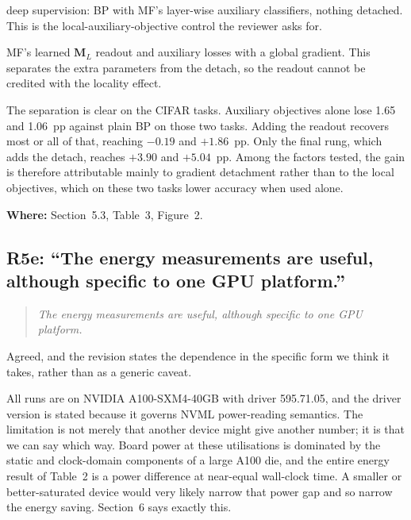\documentclass[11pt,a4paper]{article}
\newcommand{\MF}{MF}
\newcommand{\BP}{BP}
\newcommand{\BPDS}{BP-DS}
\newcommand{\MFJ}{MF-Joint}
\newenvironment{comment}%
  {\begin{quote}\itshape\small}%
  {\end{quote}}
\newcommand{\where}[1]{\par\smallskip\noindent\textbf{Where:} #1\par}
\begin{document}
\begin{description}[topsep=4pt,itemsep=2pt,parsep=0pt]
  \item[\BPDS{}] deep supervision: \BP{} with \MF{}'s layer-wise auxiliary
    classifiers, nothing detached. This is the local-auxiliary-objective
    control the reviewer asks for.
  \item[\MFJ{}] \MF{}'s learned $\mathbf{M}_L$ readout and auxiliary losses with a
    global gradient. This separates the extra parameters from the detach, so
    the readout cannot be credited with the locality effect.
\end{description}

\noindent
The separation is clear on the CIFAR tasks. Auxiliary objectives alone lose
\num{1.65} and \num{1.06}~pp against plain \BP{} on those two tasks. Adding the
readout recovers most or all of that, reaching $-\num{0.19}$ and $+\num{1.86}$~pp.
Only the final rung, which adds the detach, reaches $+\num{3.90}$ and
$+\num{5.04}$~pp. Among the factors tested, the gain is therefore attributable
mainly to gradient detachment rather than to the local objectives, which on
these two tasks lower accuracy when used alone.

\where{Section~5.3, Table~3, Figure~2.}

\subsection*{R5e: ``The energy measurements are useful, although specific to
one GPU platform.''}

\begin{comment}
The energy measurements are useful, although specific to one GPU platform.
\end{comment}

\noindent
Agreed, and the revision states the dependence in the specific form we think
it takes, rather than as a generic caveat.

All runs are on NVIDIA A100-SXM4-40GB with driver 595.71.05, and the driver
version is stated because it governs NVML power-reading semantics. The
limitation is not merely that another device might give another number; it is
that we can say which way. Board power at these utilisations is dominated by
the static and clock-domain components of a large A100 die, and the entire
energy result of Table~2 is a power difference at near-equal wall-clock time. A
smaller or better-saturated device would very likely narrow that power gap and
so narrow the energy saving. Section~6 says exactly this.
\end{document}
